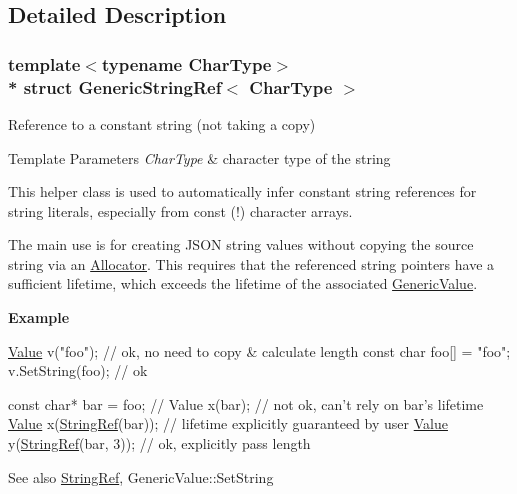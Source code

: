\subsection{Detailed Description}
\subsubsection*{template$<$typename Char\+Type$>$\\*
struct Generic\+String\+Ref$<$ Char\+Type $>$}

Reference to a constant string (not taking a copy) 


\begin{DoxyTemplParams}{Template Parameters}
{\em Char\+Type} & character type of the string\\
\hline
\end{DoxyTemplParams}
This helper class is used to automatically infer constant string references for string literals, especially from {\ttfamily const} {\bfseries }(!) character arrays.

The main use is for creating J\+S\+ON string values without copying the source string via an \hyperlink{md_C:_Users_Bilal_Itani_Desktop_inf2990-11_Cadriciel_Commun_Externe_RapidJSON_doc_internals_Allocator}{Allocator}. This requires that the referenced string pointers have a sufficient lifetime, which exceeds the lifetime of the associated \hyperlink{class_generic_value}{Generic\+Value}.

{\bfseries Example} 
\begin{DoxyCode}
\hyperlink{class_generic_value}{Value} v(\textcolor{stringliteral}{"foo"});   \textcolor{comment}{// ok, no need to copy & calculate length}
\textcolor{keyword}{const} \textcolor{keywordtype}{char} foo[] = \textcolor{stringliteral}{"foo"};
v.SetString(foo); \textcolor{comment}{// ok}

\textcolor{keyword}{const} \textcolor{keywordtype}{char}* bar = foo;
\textcolor{comment}{// Value x(bar); // not ok, can't rely on bar's lifetime}
\hyperlink{class_generic_value}{Value} x(\hyperlink{struct_generic_string_ref_aa6b9fd9f6aa49405a574c362ba9af6b5}{StringRef}(bar)); \textcolor{comment}{// lifetime explicitly guaranteed by user}
\hyperlink{class_generic_value}{Value} y(\hyperlink{struct_generic_string_ref_aa6b9fd9f6aa49405a574c362ba9af6b5}{StringRef}(bar, 3));  \textcolor{comment}{// ok, explicitly pass length}
\end{DoxyCode}


\begin{DoxySeeAlso}{See also}
\hyperlink{struct_generic_string_ref_aa6b9fd9f6aa49405a574c362ba9af6b5}{String\+Ref}, Generic\+Value\+::\+Set\+String 
\end{DoxySeeAlso}


